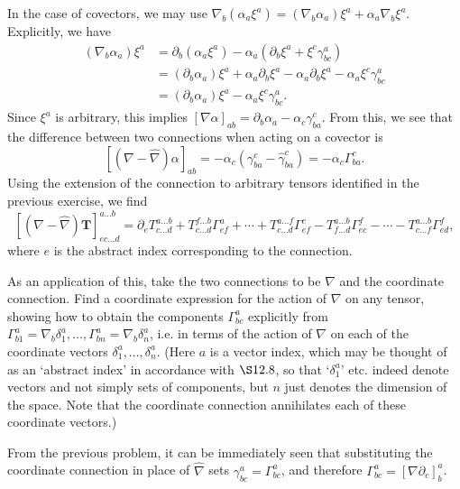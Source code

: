 \documentclass[../the-road-to-reality.tex]{subfiles}
\begin{document}
\begin{questions}
\begin{solution}
		In the case of covectors, we may use $\nabla_b(\alpha_a\xi^a) = (\nabla_b\alpha_a)\xi^a + \alpha_a\nabla_b\xi^a$. Explicitly, we have
		\begin{align*}
			(\nabla_b\alpha_a)\xi^a &= \partial_b(\alpha_a\xi^a) - \alpha_a(\partial_b\xi^a + \xi^c\gamma^a_{bc}) \\
						&= (\partial_b{\alpha_a})\xi^a + \alpha_a\partial_b\xi^a - \alpha_a\partial_b\xi^a - \alpha_a\xi^c\gamma^a_{bc} \\
						&= (\partial_b{\alpha_a})\xi^a - \alpha_a\xi^c\gamma^a_{bc}
		.\end{align*}
		Since $\xi^a$ is arbitrary, this implies $[\nabla\alpha]_{ab} = \partial_b\alpha_a - \alpha_c\gamma^c_{ba}$. From this, we see that the difference between two connections when acting on a covector is
		\[
			[(\nabla -\hat{\nabla})\alpha]_{ab} = -\alpha_c(\gamma^c_{ba} - \hat{\gamma}^c_{ba}) = -\alpha_c\Gamma^c_{ba}
		.\] 
		Using the extension of the connection to arbitrary tensors identified in the previous exercise, we find
		\[
			[(\nabla -\hat{\nabla})\mathbf{T}]^{a\dots{b}}_{ec\dots{d}} = \partial_eT^{a\dots{b}}_{c\dots{d}} + T^{f\dots{b}}_{c\dots{d}}\Gamma^a_{ef} + \cdots +  T^{a\dots{f}}_{c\dots{d}}\Gamma^c_{ef} - T^{a\dots{b}}_{f\dots{d}}\Gamma^f_{ec} - \cdots - T^{a\dots{b}}_{c\dots{f}}\Gamma^f_{ed}
		,\] 
		where $e$ is the abstract index corresponding to the connection.
	\end{solution}

	\question As an application of this, take the two connections to be $\nabla$ and the coordinate connection. Find a coordinate expression for the action of $\nabla$ on any tensor, showing how to obtain the components $\Gamma^a_{bc}$ explicitly from $\Gamma^a_{b1}=\nabla_b\delta^a_1,\dots,\Gamma^a_{bn}=\nabla_b\delta^a_n$, i.e. in terms of the action of $\nabla$ on each of the coordinate vectors $\delta^a_1, \dots, \delta^a_n$. (Here $a$ is a vector index, which may be thought of as an `abstract index' in accordance with $\S12.8$, so that `$\delta^a_1$' etc. indeed denote vectors and not simply sets of components, but $n$ just denotes the dimension of the space. Note that the coordinate connection annihilates each of these coordinate vectors.)

	\begin{solution}
		From the previous problem, it can be immediately seen that substituting the coordinate connection in place of $\hat{\nabla}$ sets $\gamma^a_{bc} = \Gamma^a_{bc}$, and therefore $\Gamma^a_{bc} = [\nabla \partial_c]^a_b$.
	\end{solution}


\end{questions}
\end{document}
